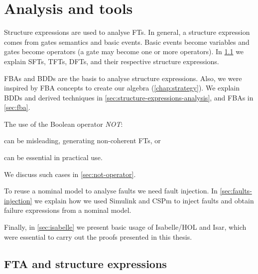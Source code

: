 \documentclass[12pt,openright,twoside,a4paper,oldfontcommands,english,brazil,final]{abntex2}
\theoremstyle{theo}
\newcommand{\simulink}{Simulink\xspace}
\begin{document}
\chapter{Analysis and tools}
\label{chap:analysis}

Structure expressions are used to analyse \aclp{FT}.
In general, a structure expression comes from gates semantics and basic events.
Basic events become variables and gates become operators (a gate may become one or more operators).
In \cref{sec:fault-trees} we explain \acp{SFT}, \acp{TFT}, \acp{DFT}, and their respective structure expressions.

\Acp{FBA} and \acp{BDD} are the basis to analyse structure expressions.
Also, we were inspired by \ac{FBA} concepts to create our \acl{algebra} (\cref{chap:strategy}).
We explain \acp{BDD} and derived techniques in \cref{sec:structure-expressions-analysis}, and \acp{FBA} in \cref{sec:fba}.

The use of the Boolean operator \emph{NOT}:
\begin{alineasinline}
  \item can be misleading, generating non-coherent \aclp{FT}, or
  \item can be essential in practical use.
\end{alineasinline}
We discuss such cases in \cref{sec:not-operator}.

To reuse a nominal model to analyse faults we need fault injection.
In \cref{sec:faults-injection} we explain how we used \simulink and \ac{CSPm} to inject faults and obtain failure expressions from a nominal model.

Finally, in \cref{sec:isabelle} we present basic usage of Isabelle/HOL and \ac{Isar}, which were essential to carry out the proofs presented in this thesis.

\section{\Acl*{FTA} and structure expressions}
\label{sec:fault-trees}
\end{document}
